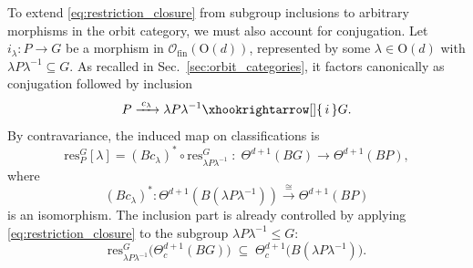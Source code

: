 \documentclass[aps,prx,reprint,superscriptaddress,twocolumn,amsmath,amssymb,amsfonts, nofootinbib]{revtex4-2}
\newcommand{\ofin}{\mathcal{O}_{\text{fin}}}
\newcommand{\res}{\text{res}}
\theoremstyle{apsstyle}
\begin{document}
To extend \eqref{eq:restriction_closure} from subgroup inclusions to arbitrary morphisms in the orbit category, we must also account for conjugation. Let $i_\lambda :P\to G$ be a morphism in $\ofin(\mathrm{O}(d))$, represented by some $\lambda \in \mathrm{O}(d)$ with $\lambda P\lambda ^{-1}\subseteq G$. As recalled in Sec.~\ref{sec:orbit_categories}, it factors canonically as conjugation followed by inclusion
\begin{equation*}
    P \xrightarrow[]{\;c_{\lambda }\;} \lambda P\lambda ^{-1} \xhookrightarrow[]{\,i\,} G.
\end{equation*}
By contravariance, the induced map on classifications is
\begin{equation*}
    \res^{G}_{P}[\lambda ]=
    (Bc_{\lambda })^{*}\circ \res^{G}_{\lambda P\lambda ^{-1}}
    \;:\;
    \Theta^{d+1}(BG)\longrightarrow \Theta^{d+1}(BP),
\end{equation*}
where 
\begin{equation}
\label{eq:conj_isom}
(Bc_{\lambda })^{*}:\Theta^{d+1}(B(\lambda P\lambda ^{-1}))\xrightarrow{\cong}\Theta^{d+1}(BP)
\end{equation}
is an isomorphism. The inclusion part is already controlled by
applying \eqref{eq:restriction_closure} to the subgroup $\lambda P\lambda ^{-1}\le G$:
\begin{equation}
    \label{eq:st1}\res^{G}_{\lambda P\lambda ^{-1}}\bigl(\Theta^{d+1}_{c}(BG)\bigr)
    \;\subseteq\;
    \Theta^{d+1}_{c} \bigl(B(\lambda P\lambda ^{-1})\bigr).
\end{equation}
\end{document}
